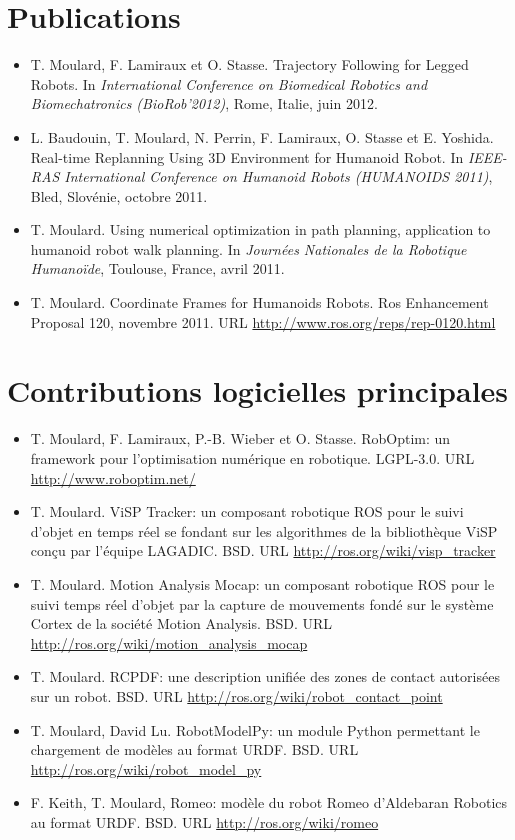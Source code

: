 \chapter*{Publications}\label{chap:publis}

\begin{itemize}
\item T. Moulard, F. Lamiraux et O. Stasse. Trajectory Following for
  Legged Robots. In \emph{International Conference on Biomedical
    Robotics and Biomechatronics (BioRob'2012)}, Rome, Italie, juin
  2012.
\item L. Baudouin, T. Moulard, N. Perrin, F. Lamiraux, O. Stasse et
  E. Yoshida. Real-time Replanning Using 3D Environment for Humanoid
  Robot. In \emph{IEEE-RAS International Conference on Humanoid Robots
    (HUMANOIDS 2011)}, Bled, Slovénie, octobre 2011.
\item T. Moulard. Using numerical optimization in path planning,
  application to humanoid robot walk planning. In \emph{Journées
    Nationales de la Robotique Humanoïde}, Toulouse, France, avril
  2011.
\item T. Moulard. Coordinate Frames for Humanoids Robots. Ros
  Enhancement Proposal 120, novembre 2011. URL
  \url{http://www.ros.org/reps/rep-0120.html}
\end{itemize}


\chapter*{Contributions logicielles principales}\label{chap:soft}

\begin{itemize}
\item T. Moulard, F. Lamiraux, P.-B. Wieber et O. Stasse. RobOptim: un
  framework pour l'optimisation numérique en robotique. LGPL-3.0. URL
  \url{http://www.roboptim.net/}
\item T. Moulard. ViSP Tracker: un composant robotique ROS pour le
  suivi d'objet en temps réel se fondant sur les algorithmes de la
  bibliothèque ViSP conçu par l'équipe LAGADIC. BSD. URL
  \url{http://ros.org/wiki/visp_tracker}
\item T. Moulard. Motion Analysis Mocap: un composant robotique ROS
  pour le suivi temps réel d'objet par la capture de mouvements fondé
  sur le système Cortex de la société Motion Analysis. BSD. URL
  \url{http://ros.org/wiki/motion_analysis_mocap}
\item T. Moulard. RCPDF: une description unifiée des zones de contact
  autorisées sur un robot. BSD. URL
  \url{http://ros.org/wiki/robot_contact_point}
\item T. Moulard, David Lu. RobotModelPy: un module Python permettant
  le chargement de modèles au format URDF. BSD. URL
  \url{http://ros.org/wiki/robot_model_py}
\item F. Keith, T. Moulard, Romeo: modèle du robot Romeo d'Aldebaran
  Robotics au format URDF. BSD. URL \url{http://ros.org/wiki/romeo}
\end{itemize}
